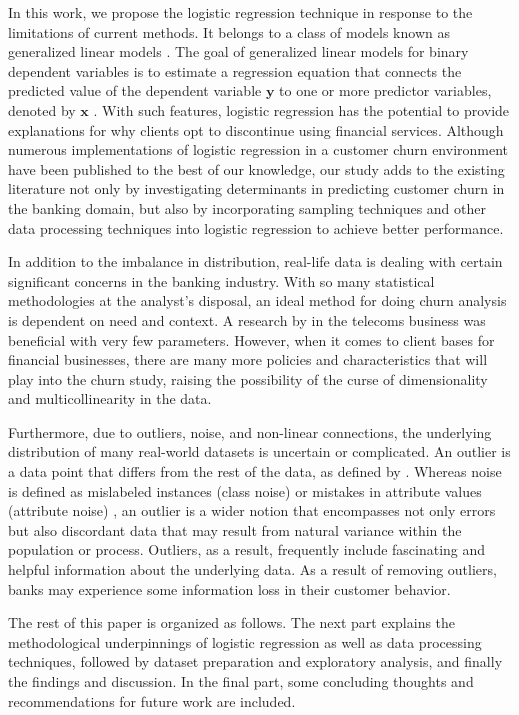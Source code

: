 In this work, we propose the logistic regression technique in response
to the limitations of current methods. It belongs to a class of models
known as generalized linear models \citep{Zumel2014}. The goal of
generalized linear models for binary dependent variables is to estimate
a regression equation that connects the predicted value of the dependent
variable \(\mathbf{y}\) to one or more predictor variables, denoted by
\(\mathbf{x}\) \citep{Heeringa2010}. With such features, logistic
regression has the potential to provide explanations for why clients opt
to discontinue using financial services. Although numerous
implementations of logistic regression in a customer churn environment
have been published to the best of our knowledge, our study adds to the
existing literature not only by investigating determinants in predicting
customer churn in the banking domain, but also by incorporating sampling
techniques and other data processing techniques into logistic regression
to achieve better performance.

In addition to the imbalance in distribution, real-life data is dealing
with certain significant concerns in the banking industry. With so many
statistical methodologies at the analyst's disposal, an ideal method for
doing churn analysis is dependent on need and context. A research by
\citet{Sebastian2017} in the telecoms business was beneficial with very
few parameters. However, when it comes to client bases for financial
businesses, there are many more policies and characteristics that will
play into the churn study, raising the possibility of the curse of
dimensionality and multicollinearity in the data.

Furthermore, due to outliers, noise, and non-linear connections, the
underlying distribution of many real-world datasets is uncertain or
complicated. An outlier is a data point that differs from the rest of
the data, as defined by \citet{Barnet1984}. Whereas noise is defined as
mislabeled instances (class noise) or mistakes in attribute values
(attribute noise) \citep{Salgado2016}, an outlier is a wider notion that
encompasses not only errors but also discordant data that may result
from natural variance within the population or process. Outliers, as a
result, frequently include fascinating and helpful information about the
underlying data. As a result of removing outliers, banks may experience
some information loss in their customer behavior.

The rest of this paper is organized as follows. The next part explains
the methodological underpinnings of logistic regression as well as data
processing techniques, followed by dataset preparation and exploratory
analysis, and finally the findings and discussion. In the final part,
some concluding thoughts and recommendations for future work are
included.

